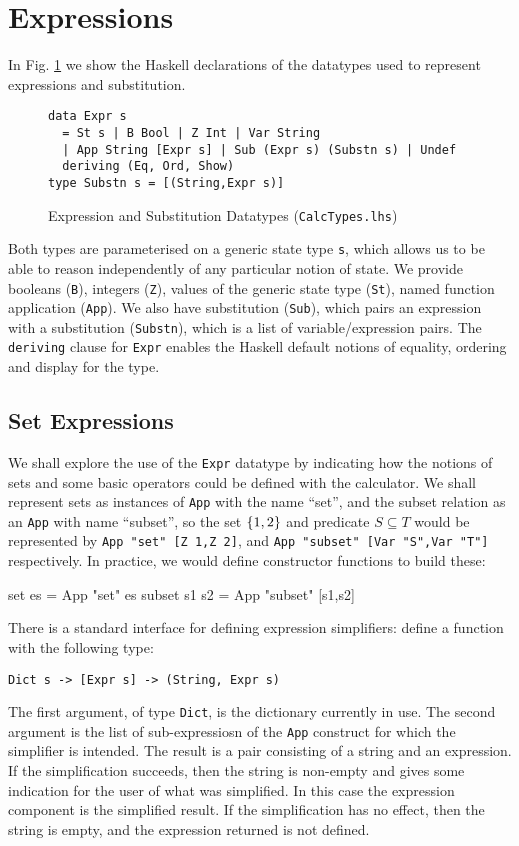 \section{Expressions}\label{sec:Expressions}

In Fig. \ref{fig:expr-types} we show the Haskell declarations
of the datatypes used to represent expressions and substitution.
\begin{figure}[tb]
\begin{verbatim}
data Expr s
  = St s | B Bool | Z Int | Var String
  | App String [Expr s] | Sub (Expr s) (Substn s) | Undef
  deriving (Eq, Ord, Show)
type Substn s = [(String,Expr s)]
\end{verbatim}
  \caption{Expression and Substitution Datatypes (\texttt{CalcTypes.lhs})}
  \label{fig:expr-types}
\end{figure}
Both types are parameterised on a generic state type \texttt{s},
which allows us to be able to reason independently
of any particular notion of state.
We provide booleans (\texttt{B}),
integers (\texttt{Z}),
values of the generic state type (\texttt{St}),
named function application (\texttt{App}).
We also have substitution (\texttt{Sub}), which pairs an expression
with a substitution (\texttt{Substn}),
which is a list of variable/expression pairs.
The \texttt{deriving} clause for \texttt{Expr} 
enables the Haskell default notions
of equality, ordering and display for the type.

\subsection{Set Expressions}

We shall explore the use of the \texttt{Expr}  datatype
by indicating how the notions of sets and some basic operators
could be defined with the calculator.
We shall represent sets as instances of \texttt{App} with the name ``set'',
and the subset relation as an \texttt{App} with name ``subset'',
so the set $\{{1,2}\}$  and predicate $S \subseteq T$
would be represented by
\verb$App "set" [Z 1,Z 2]$,
and
\verb$App "subset" [Var "S",Var "T"]$ respectively.
In practice, we would define constructor functions to build
these:
\begin{code}
set es = App "set" es
subset s1 s2 = App "subset" [s1,s2]
\end{code}
There is a standard interface for defining expression simplifiers:
define a function with the following type:
\begin{verbatim}
Dict s -> [Expr s] -> (String, Expr s)
\end{verbatim}
The first argument, of type \texttt{Dict},
is the dictionary currently in use.
The second argument is the list of sub-expressiosn of
the \texttt{App} construct for which the simplifier is intended.
The result is a pair consisting of a string and an expression.
If the simplification succeeds, then the string is non-empty
and gives some indication for the user
of what was simplified.
In this case the expression component is the simplified result.
If the simplification has no effect, then the string is empty,
and the expression returned is not defined.

